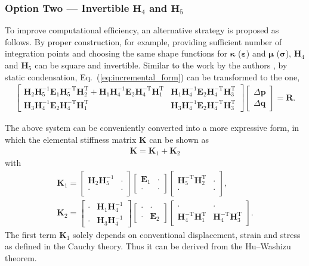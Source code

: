 \documentclass[3p,sort&compress,11pt,fleqn,review]{elsarticle}
\newcommand*{\alert}[1]{#1}
\newcommand*{\eqsref}[1]{Eq.~(\ref{#1})}
\newcommand*{\mb}[1]{\boldsymbol{#1}}
\newcommand*{\mT}{\mathrm{T}}
\begin{document}
\subsubsection{Option Two --- Invertible $\mb{H}_4$ and $\mb{H}_5$}
\alert{To improve computational efficiency, an alternative strategy is proposed as follows.} By proper construction, \alert{for example, providing sufficient number of integration points and choosing the same shape functions for $\mb{\kappa}$ ($\mb{\varepsilon}$) and $\mb{\mu}$ ($\mb{\sigma}$),} $\mb{H}_4$ and $\mb{H}_5$ can be square and invertible. Similar to the work by the authors \citep{Chang2019}, by static condensation, \eqsref{eq:incremental_form} can be transformed to the one,
\begin{gather}
\begin{bmatrix}
\mb{H}_2\mb{H}_5^{-1}\mb{E}_1\mb{H}_5^{-\mT}\mb{H}_2^\mT+\mb{H}_1\mb{H}_4^{-1}\mb{E}_2\mb{H}_4^{-\mT}\mb{H}_1^\mT&\mb{H}_1\mb{H}_4^{-1}\mb{E}_2\mb{H}_4^{-\mT}\mb{H}_3^\mT\\
\mb{H}_3\mb{H}_4^{-1}\mb{E}_2\mb{H}_4^{-\mT}\mb{H}_1^\mT&\mb{H}_3\mb{H}_4^{-1}\mb{E}_2\mb{H}_4^{-\mT}\mb{H}_3^\mT
\end{bmatrix}
\begin{bmatrix}
\Delta\mb{p}\\\Delta\mb{q}
\end{bmatrix}=\mb{R}.
\end{gather}

The above system can be conveniently converted into a more expressive form, in which the elemental stiffness matrix $\mb{K}$ can be shown as
\begin{gather}\label{eq:stiffness}
\mb{K}=\mb{K}_1+\mb{K}_2
\end{gather}
with
\begin{gather}
\mb{K}_1=\begin{bmatrix}
\mb{H}_2\mb{H}_5^{-1}&\cdot\\\cdot&\cdot
\end{bmatrix}\begin{bmatrix}
\mb{E}_1&\cdot\\\cdot&\cdot
\end{bmatrix}\begin{bmatrix}
\mb{H}_5^{-\mT}\mb{H}_2^\mT&\cdot\\\cdot&\cdot
\end{bmatrix},\\
\mb{K}_2=\begin{bmatrix}
\cdot&\mb{H}_1\mb{H}_4^{-1}\\\cdot&\mb{H}_3\mb{H}_4^{-1}
\end{bmatrix}\begin{bmatrix}
\cdot&\cdot\\\cdot&\mb{E}_2
\end{bmatrix}\begin{bmatrix}
\cdot&\cdot\\\mb{H}_4^{-\mT}\mb{H}_1^\mT&\mb{H}_4^{-\mT}\mb{H}_3^\mT
\end{bmatrix}.
\end{gather}
The first term $\mb{K}_1$ solely depends on conventional displacement, strain and stress as defined in the Cauchy theory. Thus it can be derived from the Hu--Washizu theorem.
\end{document}
